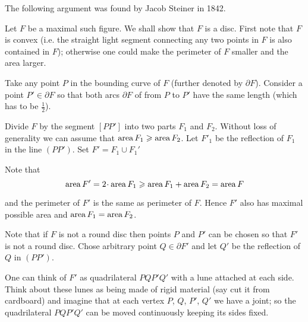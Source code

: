 The following argument was found by Jacob Steiner in 1842.

Let $F$ be a maximal such figure.  We shall show that $F$ is a disc.  First note that $F$ is convex (i.e. the straight light segment connecting any two points in $F$ is also contained in $F$); 
otherwise one could make the perimeter of $F$ smaller and the area larger.

Take any point $P$ in the bounding curve of $F$ (further denoted by $\partial F$).
Consider a point $P'\in\partial F$ so that both arcs $\partial F$ of from $P$ to $P'$ have the same length (which has to be $\tfrac12$).


Divide $F$ by the segment $[PP']$ into two parts $F_1$ and $F_2$.
Without loss of generality we can assume that $\operatorname{area} F_1\geqslant \operatorname{area} F_2$.
Let $F'_1$ be the reflection of $F_1$ in the line $(PP')$.
Set $F'=F_1\cup F_1'$



Note that 
$$\area F'=2\cdot\area F_1\ge \area F_1+\area F_2=\area F$$    


\noi and the perimeter of $F'$ is the same as perimeter of $F$.
Hence $F'$ also has maximal possible area and $\operatorname{area} F_1=\operatorname{area} F_2$.


Note that if $F$ is not a round disc then points $P$ and $P'$ can be chosen so that $F'$ is not a round disc.
Chose arbitrary point $Q\in \partial F'$ and let $Q'$ be the reflection of $Q$ in $(PP')$.


One can think of $F'$ as quadrilateral $PQP'Q'$ with a lune attached at each side.
Think about these lunes as being made of rigid material (say cut it from cardboard)
and imagine that at each vertex $P$, $Q$, $P'$, $Q'$ we have a joint;
so the quadrilateral $PQP'Q'$ can be moved continuously keeping its sides fixed.

